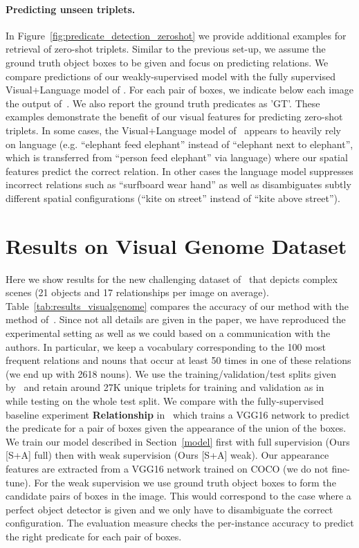 \documentclass[10pt,twocolumn,letterpaper]{article}
\begin{document}
\paragraph{Predicting unseen triplets.}
In Figure~\ref{fig:predicate_detection_zeroshot} we provide additional examples for retrieval of zero-shot triplets. Similar to the previous set-up, we assume the ground truth object boxes to be given and focus on predicting relations.  We compare predictions of our weakly-supervised model with the fully supervised Visual+Language model of \cite{Lu16}. 
For each pair of boxes, we indicate below each image the output of~\cite{Lu16}. We also report the ground truth predicates as 'GT'. These examples demonstrate the benefit of our visual features for predicting zero-shot triplets. In some cases, the Visual+Language model of~\cite{Lu16} appears to heavily rely on language (e.g. ``elephant feed elephant'' instead of ``elephant next to elephant'', which is transferred from ``person feed elephant'' via language) where our spatial features  predict the correct relation. In other cases the language model suppresses  incorrect relations such as ``surfboard wear hand'' as well as disambiguates subtly different spatial configurations (``kite on street'' instead of ``kite above street'').




\section{Results on Visual Genome Dataset}


\label{part:vg}
Here we show results for the new challenging dataset
of~\cite{Krishna2016} that depicts complex scenes (21 objects and 17
relationships per image on
average). Table~\ref{tab:results_visualgenome} compares the accuracy
of our method with the method of~\cite{Krishna2016}.
Since not all details are given in the paper, we have reproduced the experimental setting as well as we could based on a communication with the authors. In particular, we
keep a vocabulary corresponding to the 100 most frequent relations and nouns that
occur at least 50 times in one of these relations (we end up with 2618
nouns). We use the training/validation/test splits given
by~\cite{Johnson2015} and retain around 27K unique triplets for
training and validation as in~\cite{Krishna2016} while testing on the
whole test split. We compare with the fully-supervised baseline
experiment \textbf{Relationship} in~\cite{Krishna2016} which trains a
VGG16 network to predict the predicate for a pair of boxes given the
appearance of the union of the boxes. We train our model described in
Section~\ref{model} first with full supervision (Ours [S+A] full) then
with weak supervision (Ours [S+A] weak). Our appearance features are
extracted from a VGG16 network trained on COCO (we do not
fine-tune). For the weak supervision we use ground truth object boxes
to form the candidate pairs of boxes in the image. This would
correspond to the case where a perfect object detector is given and we
only have to disambiguate the correct configuration. The evaluation
measure checks the per-instance accuracy to predict the right
predicate for each pair of boxes.  
\end{document}
